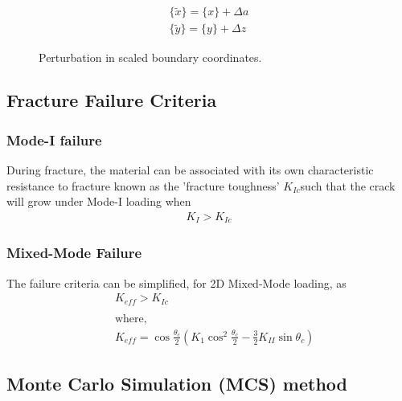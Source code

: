 \documentclass[12pt]{article}
\begin{document}
\begin{align*}
    \{\tilde{x}\} = \{x\} + \Delta a\\
    \{\tilde{y}\} = \{y\} + \Delta z
\end{align*}
\begin{figure}[H]
    \centering
    \captionsetup{labelformat=empty}
    \caption{Perturbation in scaled boundary coordinates.}  
\end{figure}

\subsection{Fracture Failure Criteria}
\subsubsection{Mode-I failure}
During fracture, the material can be associated with its own characteristic resistance to fracture known as the ’fracture
toughness’ $K_{Ic} $such that the crack will grow under Mode-I loading when
\begin{align*}
    K_I > K_{Ic}
\end{align*}
\subsubsection{Mixed-Mode Failure}
The failure criteria can be simplified, for 2D Mixed-Mode loading, as
\begin{align*}
    &K_{eff} > K_{Ic}\\~\\
    &\text{where,}\\
    &K_{eff} = \cos\frac{\theta_c}{2}\left(K_1 \cos^2\frac{\theta_c}{2}- \frac{3}{2}K_{II}\sin\theta_c\right)
\end{align*}
\subsection{Monte Carlo Simulation (MCS) method}
\end{document}
